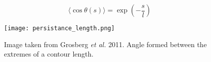 \begin{equation} \label{eq: contour length mean angle}
    \langle \cos{\theta(s)}\rangle = \exp{\left(-\frac{s}{l}\right)}
\end{equation}

\begin{figure}[H] 
    \centering 
    \texttt{[image: persistance\_length.png]} 
    \caption{Image taken from Grosberg \textit{et al.} 2011\cite{grosbergGiantMoleculesHere2011}. Angle formed between the extremes of a contour length.} 
    \label{examplelabel} 
\end{figure}

